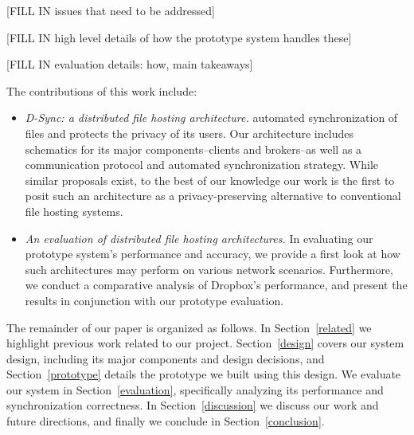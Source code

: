 [FILL IN issues that need to be addressed]


[FILL IN high level details of how the prototype system handles these]

[FILL IN evaluation details: how, main takeaways]

The contributions of this work include:
\begin{itemize}
\item \emph{D-Sync: a distributed file hosting architecture.} 
automated synchronization of files and protects the privacy of its users.
Our architecture includes schematics for its major components--clients and brokers--as well as a communication protocol and automated synchronization strategy.
While similar proposals exist, to the best of our knowledge 
our work is the first to posit such an architecture as a privacy-preserving alternative to conventional file hosting systems.
\item \emph{An evaluation of distributed file hosting architectures.}
In evaluating our prototype system's performance and accuracy,
we provide a first look at how such architectures may perform
on various network scenarios.
Furthermore, we conduct a comparative analysis of Dropbox's
performance, and present the results in conjunction with our prototype evaluation.
\end{itemize}

The remainder of our paper is organized as follows.
In Section~\ref{related} we highlight previous work related to our project.
Section~\ref{design} covers our system design, including
its major components and design decisions,
and Section~\ref{prototype} details the prototype we built using this design.
We evaluate our system in Section~\ref{evaluation}, specifically
analyzing its performance and synchronization correctness.
In Section~\ref{discussion} we discuss our work and future directions,
and finally we conclude in Section~\ref{conclusion}.
